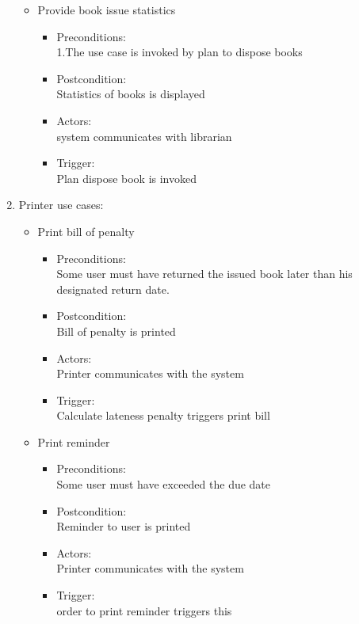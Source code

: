 \documentclass[a4paper]{article}
\begin{document}
\begin{enumerate}
\begin{itemize}
 \item Provide book issue statistics
	\begin{itemize}
	\item  Preconditions:\\ 1.The use case is invoked by plan to dispose books\\ 
 \item Postcondition:\\ Statistics of books is displayed\\ 
 \item Actors: \\ system communicates with librarian\\ 
 \item Trigger:\\ Plan dispose book is invoked\\ 
	\end{itemize}

 \end{itemize}
\item Printer use cases:\\ 
\begin{itemize}
\item Print bill of penalty\\ 
\begin{itemize}
\item Preconditions:\\ Some user must have returned the issued book later than his designated return date.\\ 
 \item Postcondition:\\ Bill of penalty is printed\\ 
 \item Actors:\\  Printer communicates with the system\\ 
 \item Trigger:\\  Calculate lateness penalty triggers print bill\\ 
\end{itemize}

\item Print reminder\\ 
\begin{itemize}
\item  Preconditions:\\ Some user must have exceeded the due date\\ 
 \item Postcondition:\\ Reminder to user is printed\\ 
 \item Actors:\\  Printer communicates with the system\\ 
 \item Trigger:\\ order to print reminder triggers this\\ 
\end{itemize}


\end{itemize}
\end{enumerate}
\end{document}
